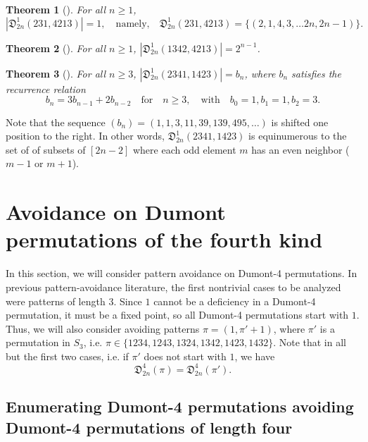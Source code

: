 \documentclass[
final
]{dmtcs-episciences}
\newtheorem{theorem}{Theorem}[section]%
\theoremstyle{definition}
\theoremstyle{remark}
\begin{document}
\begin{theorem}[\cite{Burstein_Dyck}] 
For all $n\ge 1$,
\[
|\mathfrak{D}^1_{2n} (231, 4213)| = 1, \quad \text{namely,} \quad \mathfrak{D}^1_{2n} (231, 4213) = \{(2, 1, 4, 3, \dots 2n, 2n-1)\}.
\]
\end{theorem}

\begin{theorem}[\cite{Burstein_Dyck}] 
For all $n\ge 1$, $|\mathfrak{D}^1_{2n} (1342, 4213)| = 2^{n-1}$.
\end{theorem}

\begin{theorem}[\cite{Burstein_Dyck}] 
For all $n\ge 3$,
$|\mathfrak{D}^1_{2n} (2341, 1423)| = b_n$, where $b_n$ satisfies the recurrence relation 
\[
b_n = 3b_{n-1} + 2b_{n-2} \quad \text{for} \quad n \ge 3, \quad \text{with} \quad b_0 = 1, b_1 = 1, b_2 = 3.
\]
\end{theorem}

Note that the sequence $(b_n)=(1, 1, 3, 11, 39, 139, 495, \dots)$ is \cite[A007482]{OEIS} shifted one position to the right. In other words, $\mathfrak{D}^1_{2n} (2341, 1423)$ is equinumerous to the set of of subsets of $[2n-2]$ where each odd element $m$ has an even neighbor ($m-1$ or $m+1$).




\section{Avoidance on Dumont permutations of the fourth kind}

In this section, we will consider pattern avoidance on Dumont-4 permutations. In previous pattern-avoidance literature, the first nontrivial cases to be analyzed were patterns of length $3$. Since $1$ cannot be a deficiency in a Dumont-4 permutation, it must be a fixed point, so all Dumont-4 permutations start with $1$. Thus, we will also consider avoiding patterns $\pi= (1,\pi'+1)$, where $\pi'$ is a permutation in $S_3$, i.e. $\pi\in\{1234, 1243, 1324, 1342, 1423, 1432\}$. Note that in all but the first two cases, i.e. if $\pi'$ does not start with $1$, we have 
\[
\mathfrak{D}^4_{2n}(\pi)=\mathfrak{D}^4_{2n}(\pi').
\]

\subsection{Enumerating Dumont-4 permutations avoiding Dumont-4 permutations of length four}
\end{document}
